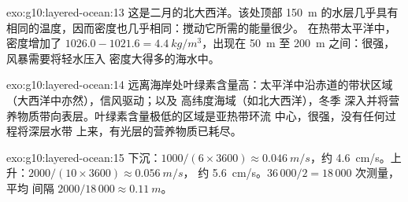 \begin{solution}{exo:g10:layered-ocean:13}
这是二月的北大西洋。该处顶部 \qty{150}{m} 的水层几乎具有
相同的温度，因而密度也几乎相同：搅动它所需的能量很少。
在热带太平洋中，密度增加了 $1026.0 - 1021.6 =
\qty{4.4}{kg/m^3}$，出现在 \qty{50}{m} 至 \qty{200}{m} 之间：很强，
风暴需要将轻水压入
密度大得多的海水中。
\end{solution}

\begin{solution}{exo:g10:layered-ocean:14}
远离海岸处叶绿素含量高：太平洋中沿赤道的带状区域
（大西洋中亦然），信风驱动；以及
高纬度海域（如北大西洋），冬季
深入并将营养物质带向表层。叶绿素含量极低的区域是亚热带环流
中心，很强，没有任何过程将深层水带
上来，有光层的营养物质已耗尽。
\end{solution}

\begin{solution}{exo:g10:layered-ocean:15}
下沉：$1000/(6 \times 3600) \approx \qty{0.046}{m/s}$，约
\qty{4.6}{cm/s}。上升：$2000/(10 \times 3600) \approx \qty{0.056}{m/s}$，
约 \qty{5.6}{cm/s}。$36\,000/2 = 18\,000$ 次测量，平均
间隔 $2000/18\,000 \approx \qty{0.11}{m}$。
\end{solution}

